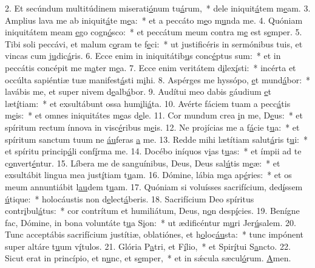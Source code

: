 2. Et secúndum multitúdinem miserati\uline{ó}num tu\uline{á}rum,~* dele iniquit\uline{á}tem m\uline{e}am.
3. Amplius lava me ab iniquit\uline{á}te m\uline{e}a:~* et a peccáto m\uline{e}o m\uline{u}nda me.
4. Quóniam iniquitátem meam \uline{e}go cogn\uline{ó}sco:~* et peccátum meum contra m\uline{e} est s\uline{e}mper.
5. Tibi soli peccávi, et malum c\uline{o}ram te f\uline{e}ci:~* ut justificéris in sermónibus tuis, et vincas cum j\uline{u}dic\uline{á}ris.
6. Ecce enim in iniquitátib\uline{u}s conc\uline{é}ptus sum:~* et in peccátis concépit me m\uline{a}ter m\uline{e}a.
7. Ecce enim veritátem d\uline{i}lex\uline{í}sti:~* incérta et occúlta sapiéntiæ tuæ manifest\uline{á}sti m\uline{i}hi.
8. Aspérges me hyssópo, \uline{e}t mund\uline{á}bor:~* lavábis me, et super nivem d\uline{e}alb\uline{á}bor.
9. Audítui meo dabis gáudium \uline{e}t læt\uline{í}tiam:~* et exsultábunt ossa hum\uline{i}li\uline{á}ta.
10. Avérte fáciem tuam a pecc\uline{á}tis m\uline{e}is:~* et omnes iniquitátes m\uline{e}as d\uline{e}le.
11. Cor mundum crea \uline{i}n me, D\uline{e}us:~* et spíritum rectum ínnova in visc\uline{é}ribus m\uline{e}is.
12. Ne projícias me a f\uline{á}cie t\uline{u}a:~* et spíritum sanctum tuum ne \uline{áu}feras \uline{a} me.
13. Redde mihi lætítiam salut\uline{á}ris t\uline{u}i:~* et spíritu princip\uline{á}li conf\uline{í}rma me.
14. Docébo iníquos v\uline{i}as t\uline{u}as:~* et ímpii ad te c\uline{o}nvert\uline{é}ntur.
15. Líbera me de sanguínibus, Deus, Deus sal\uline{ú}tis m\uline{e}æ:~* et exsultábit lingua mea just\uline{í}tiam t\uline{u}am.
16. Dómine, lábia m\uline{e}a ap\uline{é}ries:~* et os meum annuntiábit l\uline{au}dem t\uline{u}am.
17. Quóniam si voluísses sacrifícium, ded\uline{í}ssem \uline{ú}tique:~* holocáustis non d\uline{e}lect\uline{á}beris.
18. Sacrifícium Deo spíritus contr\uline{i}bul\uline{á}tus:~* cor contrítum et humiliátum, Deus, n\uline{o}n desp\uline{í}cies.
19. Benígne fac, Dómine, in bona voluntáte t\uline{u}a S\uline{i}on:~* ut ædificéntur m\uline{u}ri Jer\uline{ú}salem.
20. Tunc acceptábis sacrifícium justítiæ, oblatiónes, et h\uline{o}loc\uline{áu}sta:~* tunc impónent super altáre t\uline{u}um v\uline{í}tulos.
21. Glória P\uline{a}tri, et F\uline{í}lio,~* et Spir\uline{í}tui S\uline{a}ncto.
22. Sicut erat in princípio, et n\uline{u}nc, et s\uline{e}mper,~* et in sǽcula sæcul\uline{ó}rum. \uline{A}men.
